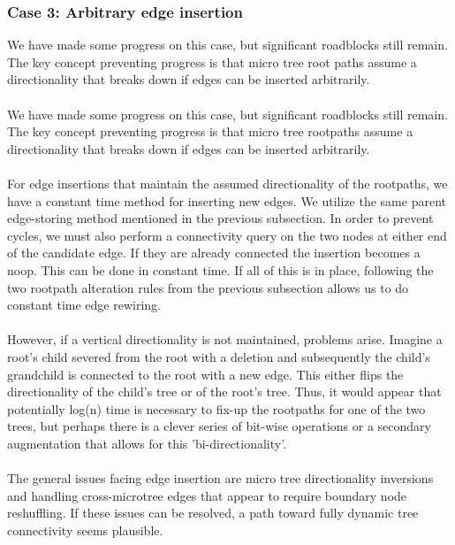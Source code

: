 \documentclass{article}
\begin{document}
\subsubsection{Case 3: Arbitrary edge insertion}
We have made some progress on this case, but significant roadblocks still remain. The key concept preventing progress is that micro tree root paths assume a directionality that breaks down if edges can be inserted arbitrarily. \\ \\
We have made some progress on this case, but significant roadblocks still remain. The key concept preventing progress is that micro tree rootpaths assume a directionality that breaks down if edges can be inserted arbitrarily. \\ \\
For edge insertions that maintain the assumed directionality of the rootpaths, we have a constant time method for inserting new edges.  We utilize the same parent edge-storing method mentioned in the previous subsection. In order to prevent cycles, we must also perform a connectivity query on the two nodes at either end of the candidate edge. If they are already connected the insertion becomes a noop. This can be done in constant time. If all of this is in place, following the two rootpath alteration rules from the previous subsection allows us to do constant time edge rewiring. \\ \\
However, if a vertical directionality is not maintained, problems arise. Imagine a root's child severed from the root with a deletion and subsequently the child's grandchild is connected to the root with a new edge. This either flips the directionality of the child's tree or of the root's tree. Thus, it would appear that potentially log(n) time is necessary to fix-up the rootpaths for one of the two trees, but perhaps there is a clever series of bit-wise operations or a secondary augmentation that allows for this 'bi-directionality'. \\ \\
The general issues facing edge insertion are micro tree directionality inversions and handling cross-microtree edges that appear to require boundary node reshuffling. If these issues can be resolved, a path toward fully dynamic tree connectivity seems plausible.



\end{document}
